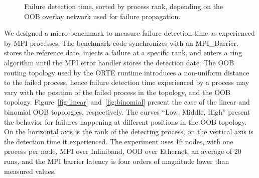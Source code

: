 \begin{figure}[htb]
\centering 
  \hfill
  \vspace{-.2cm}
\caption{Failure detection time, sorted by process rank, depending on the OOB overlay network used for 
failure propagation.}\label{fig:detect}
\end{figure}

We designed a micro-benchmark to measure failure detection time as
experienced by MPI processes. The benchmark code synchronizes with an
MPI\_Barrier, stores the reference date, injects a failure at a specific
rank, and enters a ring algorithm until the MPI error handler stores the
detection date. The OOB routing topology used by the ORTE runtime introduces a
non-uniform distance to the failed process, hence failure detection time
experienced by a process may vary with the position of the failed
process in the topology, and the OOB topology. Figure~\ref{fig:linear}
and~\ref{fig:binomial} present the case of the linear and
binomial OOB topologies, respectively. The curves ``Low, Middle, High'' present the
behavior for failures happening at different positions in the OOB
topology. On the horizontal axis is the rank of the detecting process,
on the vertical axis is the detection time it experienced. The
experiment uses 16 nodes, with one process per node, MPI over Infiniband, OOB
over Ethernet, an average of 20 runs, and the MPI barrier latency is four orders of
magnitude lower than measured values.

